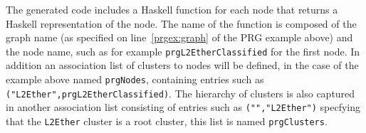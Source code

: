 \documentclass[a4paper]{article}
\begin{document}
The generated code includes a Haskell function for each node that returns a
Haskell representation of the node. The name of the function is composed of the
graph name (as specified on line~\ref{prgex:graph} of the PRG example above) and
the node name, such as for example \texttt{prgL2EtherClassified} for the first
node. In addition an association list of clusters to nodes will be defined, in
the case of the example above named \texttt{prgNodes}, containing entries such
as \lstinline!("L2Ether",prgL2EtherClassified)!. The hierarchy of clusters is
also captured in another association list consisting of entries such as
\lstinline!("","L2Ether")! specfying that the \texttt{L2Ether} cluster is a root
cluster, this list is named \texttt{prgClusters}.
\end{document}
